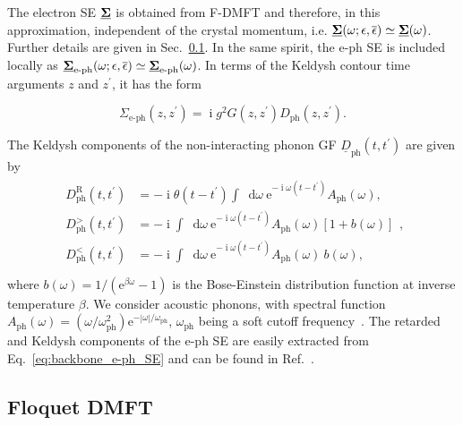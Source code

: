 \documentclass[aps,prb,groupedaddress,showpacs,twocolumn,superscriptaddress,10pt]{revtex4-2}
\newcommand{\ee}{\mathrm{e}}  %
\DeclareMathOperator*{\ii}{i} %
\newcommand*\dd{\mathop{}\!\mathrm{d}}
\newcommand{\kel}[1]{\underline{#1}} %
\begin{document}
The electron SE $\underline{\bf{\Sigma}}$ is obtained from F-DMFT and therefore, in this approximation, independent of the crystal momentum, i.e. $\underline{\bf{\Sigma}}(\omega;\epsilon,\overline{\epsilon}) \simeq \underline{\bf{\Sigma}}(\omega)$. Further details are given in Sec.~\ref{sec:FDMFT_implementation}. In the same spirit, the e-ph SE is included locally as $\underline{\bf{\Sigma}}_{\text{e-ph}}(\omega;\epsilon,\overline{\epsilon}) \simeq \underline{\bf{\Sigma}}_{\text{e-ph}}(\omega)$. In terms of the Keldysh contour time arguments $z$ and $z^\prime$, it has the form 

\begin{equation}\label{eq:backbone_e-ph_SE}
\Sigma_{\text{e-ph}}(z,z^{\prime}) = \ii g^{2} G(z,z^{\prime}) D_{\text{ph}}(z,z^{\prime}).
\end{equation}
 
The Keldysh components of the non-interacting phonon GF $\kel{D}_{\text{ph}}(t,t^{\prime})$ are given by~\cite{ao.ts.14}
%
\begin{align}\label{eq:Ph_Prop_time}
\begin{split} 
D^{\text{R}}_{\text{ph}}(t,t^{\prime}) & = -\ii \theta(t-t^{\prime}) \int \dd\omega \ \ee^{-\ii\omega\left(t-t^{\prime}\right)} A_{\text{ph}}(\omega), \\
D^{>}_{\text{ph}}(t,t^{\prime}) & = -\ii \int \dd\omega \ \ee^{-\ii\omega\left(t-t^{\prime}\right)} A_{\text{ph}}(\omega) \left[ 1 + b(\omega) \right] \\
D^{<}_{\text{ph}}(t,t^{\prime}) & = -\ii \int \dd\omega \ \ee^{-\ii\omega\left(t-t^{\prime}\right)} A_{\text{ph}}(\omega) \ b(\omega), \\
\end{split}, 
\end{align}
%
where $b(\omega)=1/(\ee^{\beta\omega}-1)$ is the Bose-Einstein distribution function at inverse temperature $\beta$. We consider acoustic phonons, with spectral function $A_{\text{ph}}(\omega) = (\omega/\omega^{2}_{\text{ph}}) \ee^{-| \omega|/\omega_{\text{ph}}}$,  $\omega_{\text{ph}}$ being a soft cutoff frequency~\cite{pi.li.21}. The retarded and Keldysh components of the e-ph SE are easily extracted from  Eq.~\eqref{eq:backbone_e-ph_SE} and can be found in Ref.~\cite{ma.ga.22u}. 
     
\subsection{Floquet DMFT} 
\label{sec:FDMFT_implementation}
\end{document}
